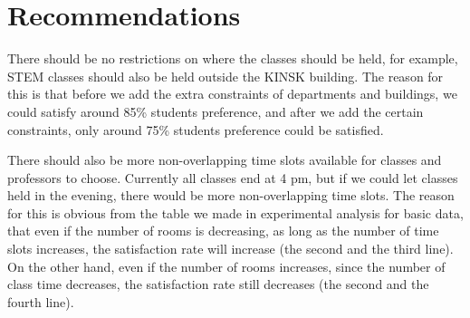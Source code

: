 \documentclass[11pt, oneside]{article}   	%
\begin{document}

\section{Recommendations}
There should be no restrictions on where the classes should be held, for example, STEM classes should also be held outside the KINSK building. The reason for this is that before we add the extra constraints of departments and buildings, we could satisfy around 85\% students preference, and after we add the certain constraints, only around 75\% students preference could be satisfied.

There should also be more non-overlapping time slots available for classes and professors to choose. Currently all classes end at 4 pm, but if we could let classes held in the evening, there would be more non-overlapping time slots. The reason for this is obvious from the table we made in experimental analysis for basic data, that even if the number of rooms is decreasing, as long as the number of time slots increases, the satisfaction rate will increase (the second and the third line). On the other hand, even if the number of rooms increases, since the number of class time decreases, the satisfaction rate still decreases (the second and the fourth line).
\end{document}

